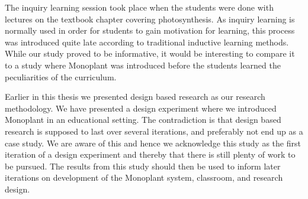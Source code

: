 The inquiry learning session took place when the students were done with lectures on the textbook chapter covering photosynthesis. As inquiry learning is normally used in order for students to gain motivation for learning, this process was introduced quite late according to traditional inductive learning methods. While our study proved to be informative, it would be interesting to compare it to a study where Monoplant was introduced before the students learned the peculiarities of the curriculum.

Earlier in this thesis we presented design based research as our research methodology. We have presented a design experiment where we introduced Monoplant in an educational setting. The contradiction is that design based research is supposed to last over several iterations, and preferably not end up as a case study. We are aware of this and hence we acknowledge this study as the first iteration of a design experiment and thereby that there is still plenty of work to be pursued. The results from this study should then be used to inform later iterations on development of the Monoplant system, classroom, and research design.
